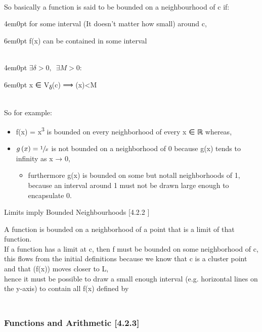 ~\\
So basically a function is said to be {bounded on a neighbourhood of
{c}} if:

4em0pt for some interval (It doesn't matter how small) around {c},

6em0pt {f}({x}) can be contained in some interval

~\\

4em0pt \(\exists \delta>0, \enspace \exists M>0:\)

6em0pt
{x} ∈ {V}\textsubscript{{δ}}({c}) ⟹ ({x})\textbar\textless{}{M}

~\\
So for example:

\begin{itemize}
\tightlist
\item
  {f}({x}) = {x}\textsuperscript{3} is {bounded on every neighborhood of
  every {x} ∈ ℝ} whereas,
\item
  \(g\left( x \right) =  \sfrac{1}{x}\) is {{not} bounded on a
  neighborhood of 0} because {g}({x}) tends to infinity as {x} → 0,

  \begin{itemize}
  \tightlist
  \item
    furthermore {g}({x}) is {bounded on {some but notall} neighborhoods
    of 1}, because an interval around 1 must not be drawn large enough
    to encapsulate 0.
  \end{itemize}
\end{itemize}

Limits imply Bounded Neighbourhoods {[}4.2.2
{]}\protect\hypertarget{limits-imply-bounded-neighbourhoods-4.2.2}{}{}

A function is bounded on a neighborhood of a point that is a limit of
that function.\\
If a function has a limit at {c}, then {f} must be {bounded on some
neighborhood of {c}},\\
this flows from the initial definitions because we know that {c} is a
cluster point and that ({f}({x})) moves closer to {L},\\
hence it must be possible to draw a small enough interval (e.g.
horizontal lines on the {y}-axis) to contain all {f}({x}) defined by

\hypertarget{functions-and-arithmetic-4.2.3}{%
\subsubsection[\hfill\break
Functions and Arithmetic
{[}4.2.3{]}]{\texorpdfstring{\protect\hypertarget{SECTION00012200000000000000}{}{}\protect\hypertarget{functions-and-arithmetic-4.2.3}{}{}~\\
Functions and Arithmetic
{[}4.2.3{]}}{ Functions and Arithmetic {[}4.2.3{]}}}\label{functions-and-arithmetic-4.2.3}}

